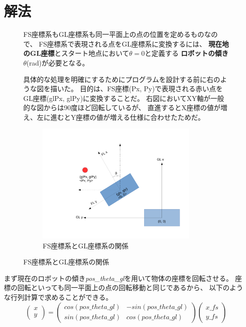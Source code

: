\documentclass[main]{subfiles}
\begin{document}
\section{解法}
\begin{figure}[H]
	\begin{minipage}{0.5\hsize}
		\setlength{\parindent}{1\Cwd}
		FS座標系もGL座標系も同一平面上の点の位置を定めるものなので、
		FS座標系で表現される点をGL座標系に変換するには、
		\textbf{現在地のGL座標}とスタート地点において$\theta = 0$と定義する
		\textbf{ロボットの傾き$\theta$}(rad)が必要となる。

		具体的な処理を明確にするためにプログラムを設計する前に右のような図を描いた。
		目的は、FS座標(Px, Py)で表現される赤い点をGL座標(glPx, glPy)に変換することだ。
		右図においてXY軸が一般的な図からは90度ほど回転しているが、
		直進するとX座標の値が増え、左に進むとY座標の値が増える仕様に合わせたためだ。
	\end{minipage}
	\begin{minipage}{0.5\hsize}
		\begin{figure}[H]
			\centering
			\includegraphics[width=8cm]{img/trans.pdf}
			\caption{FS座標系とGL座標系の関係}
		\end{figure}
	\end{minipage}
\end{figure}

まず現在のロボットの傾き\textit{pos\_theta\_gl}を用いて物体の座標を回転させる。
座標の回転といっても同一平面上の点の回転移動と同じであるから、
以下のような行列計算で求めることができる。
\[
	\left(
	\begin{array}{cc}
		x \\
		y
	\end{array}
	\right)
	=
	\left(
	\begin{array}{cc}
		cos(pos\_theta\_gl) & -sin(pos\_theta\_gl) \\
		sin(pos\_theta\_gl) & cos(pos\_theta\_gl)
	\end{array}
	\right)
	\left(
	\begin{array}{c}
		x\_fs \\
		y\_fs
	\end{array}
	\right)
\]
\end{document}

